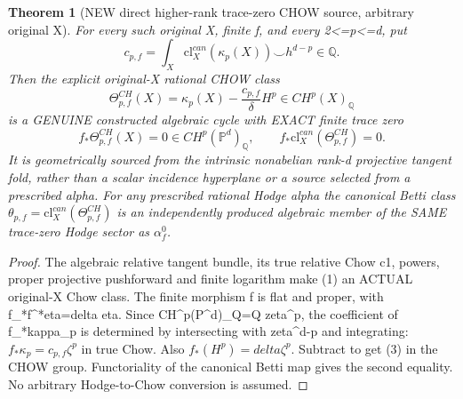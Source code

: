 \documentclass[11pt]{article}
\newtheorem{theorem}{Theorem}
\begin{document}
\begin{theorem}[NEW direct higher-rank trace-zero CHOW source, arbitrary original X]
For every such original X, finite f,
and every 2<=p<=d, put
\[
 c_{p,f}=\int_X\mathrm{cl}^{can}_X(\kappa_p(X))
                         \smile h^{d-p}\in\mathbb Q.
\]
Then the explicit original-X rational CHOW class
\[
 \boxed{
 \Theta_{p,f}^{CH}(X)=\kappa_p(X)
           -\frac{c_{p,f}}{\delta}H^p
           \in CH^p(X)_{\mathbb Q}
 }                                                       \tag{2}
\]
is a GENUINE constructed algebraic cycle
with EXACT finite trace zero
\[
 \boxed{
 f_*\Theta_{p,f}^{CH}(X)=0
                    \in CH^p(\mathbb P^d)_{\mathbb Q},
 \qquad
 f_*\mathrm{cl}^{can}_X(\Theta_{p,f}^{CH})=0 .
 }                                                       \tag{3}
\]
It is geometrically sourced from the intrinsic
nonabelian rank-d projective tangent fold,
rather than a scalar incidence hyperplane
or a source selected from a prescribed alpha.
For any prescribed rational Hodge alpha
the canonical Betti class
$\theta_{p,f}=\mathrm{cl}_X^{can}(\Theta_{p,f}^{CH})$
is an independently produced algebraic
member of the SAME trace-zero Hodge sector
as $\alpha_f^0$.
\end{theorem}
\begin{proof}
The algebraic relative tangent bundle, its
true relative Chow c1, powers, proper
projective pushforward and finite logarithm
make (1) an ACTUAL original-X Chow class.
The finite morphism f is flat and proper,
with f_*f^*eta=delta eta. Since
CH^p(P^d)_Q=Q zeta^p, the coefficient of
f_*kappa_p is determined by intersecting
with zeta^{d-p} and integrating:
$f_*\kappa_p=c_{p,f}\zeta^p$
in true Chow. Also
$f_*(H^p)=delta\zeta^p$.
Subtract to get (3) in the CHOW group.
Functoriality of the canonical Betti map
gives the second equality. No arbitrary
Hodge-to-Chow conversion is assumed.
\end{proof}
\end{document}
